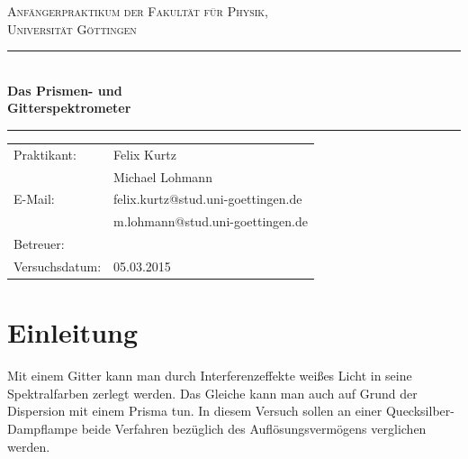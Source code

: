 \documentclass[12pt,a4paper,titlepage,headinclude,bibtotoc]{scrartcl}
\begin{document}
\begin{titlepage}
\centering
\textsc{\Large Anfängerpraktikum der Fakultät für
  Physik,\\[1.5ex] Universität Göttingen}

\vspace*{4.2cm}

\rule{\textwidth}{1pt}\\[0.5cm]
{\huge \bfseries
  Das Prismen- und\\[1.5ex]
  Gitterspektrometer}\\[0.5cm]
\rule{\textwidth}{1pt}

\vspace*{3.0cm}

\begin{Large}
\begin{tabular}{ll}
Praktikant:
 	&  Felix Kurtz\\
 	&  Michael Lohmann\\

E-Mail: 
	&  felix.kurtz@stud.uni-goettingen.de\\
	& m.lohmann@stud.uni-goettingen.de\\

 Betreuer: & \\
 Versuchsdatum: &  05.03.2015\\
\end{tabular}
\end{Large}

\vspace*{0.8cm}

\begin{Large}
\end{Large}

\end{titlepage}

\tableofcontents

\newpage

\section{Einleitung}
\label{sec:einleitung}
Mit einem Gitter kann man durch Interferenzeffekte weißes Licht in seine Spektralfarben zerlegt werden.
Das Gleiche kann man auch auf Grund der Dispersion mit einem Prisma tun.
In diesem Versuch sollen an einer Quecksilber-Dampflampe beide Verfahren  bezüglich des Auflösungsvermögens verglichen werden.
\end{document}

